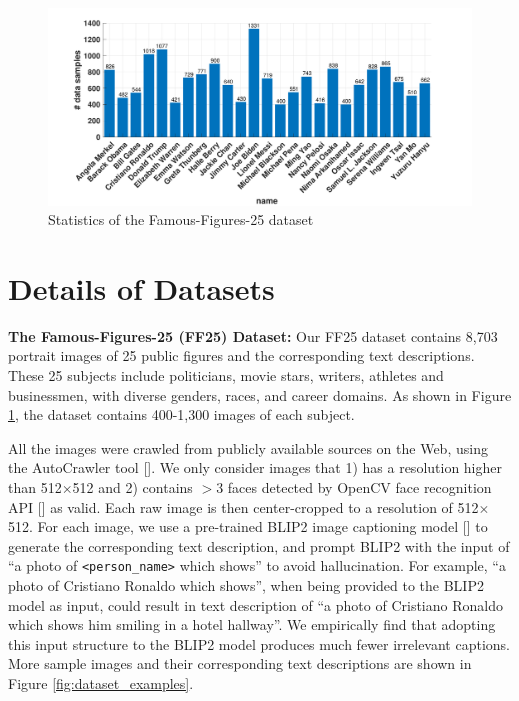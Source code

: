 \documentclass{article}
\begin{document}
\begin{figure}[h]
	\centering
	\includegraphics[width=0.9\linewidth]{figures/dataset_statistics.pdf}
	\caption{Statistics of the Famous-Figures-25 dataset}
	\label{fig:dataset_statistics}
\end{figure}


\section{Details of Datasets}\label{sec:dataset_details}


\noindent\textbf{The Famous-Figures-25 (FF25) Dataset:} Our FF25 dataset contains 8,703 portrait images of 25 public figures and the corresponding text descriptions. These 25 subjects include politicians, movie stars, writers, athletes and businessmen, with diverse genders, races, and career domains. As shown in Figure \ref{fig:dataset_statistics}, the dataset contains 400-1,300 images of each subject. 

All the images were crawled from publicly available sources on the Web, using the AutoCrawler tool []. We only consider images that 1) has a resolution higher than 512$\times$512 and 2) contains $>$3 faces detected by OpenCV face recognition API [] as valid. Each raw image is then center-cropped to a resolution of 512$\times$512. For each image, we use a pre-trained BLIP2 image captioning model [] to generate the corresponding text description, and prompt BLIP2 with the input of ``a photo of \texttt{<person\_name>} which shows'' to avoid hallucination. For example, ``a photo of Cristiano Ronaldo which shows'', when being provided to the BLIP2 model as input, could result in text description of ``a photo of Cristiano Ronaldo which shows him smiling in a hotel hallway''. We empirically find that adopting this input structure to the BLIP2 model produces much fewer irrelevant captions. More sample images and their corresponding text descriptions are shown in Figure \ref{fig:dataset_examples}.
\end{document}
